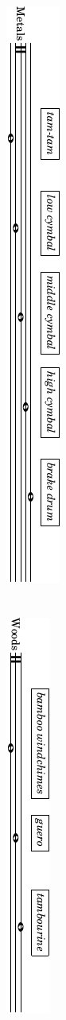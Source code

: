 \documentclass[10pt]{article}
\begin{document}
\begin{textblock}{9}
\begin{itemize}
            \includegraphics{preface-percussion-metals.pdf} \\ \\ \\
            \includegraphics{preface-percussion-woods.pdf} \\ \\ \\

\end{itemize}
\end{textblock}
\end{document}
